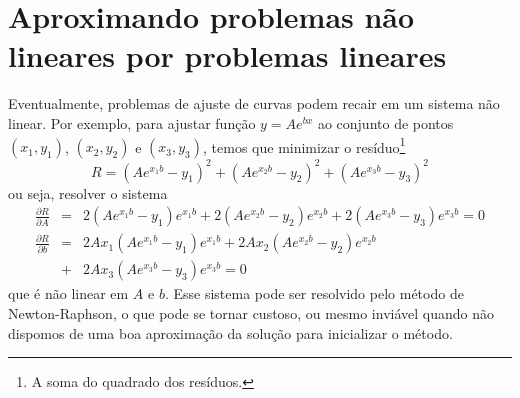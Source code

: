 


\section{Aproximando problemas não lineares por problemas lineares}

Eventualmente, problemas de ajuste de curvas podem recair em um sistema não linear. Por exemplo, para ajustar função $y=Ae^{bx}$ ao conjunto de pontos $(x_1,y_1)$, $(x_2,y_2)$ e $(x_3,y_3)$, temos que minimizar o resíduo\footnote{A soma do quadrado dos resíduos.}
\begin{equation}
R=(Ae^{x_1b}-y_1)^2+(Ae^{x_2b}-y_2)^2+(Ae^{x_3b}-y_3)^2
\end{equation}
ou seja, resolver o sistema
\begin{eqnarray}
\frac{\partial R}{\partial A} &=& 2(Ae^{x_1b}-y_1)e^{x_1b}+2(Ae^{x_2b}-y_2)e^{x_2b}+2(Ae^{x_3b}-y_3)e^{x_3b}=0\\
\frac{\partial R}{\partial b} &=& 2Ax_1(Ae^{x_1b}-y_1)e^{x_1b} + 2Ax_2(Ae^{x_2b}-y_2)e^{x_2b} \\
&+& 2Ax_3(Ae^{x_3b}-y_3)e^{x_3b}=0
\end{eqnarray}
que é não linear em $A$ e $b$. Esse sistema pode ser resolvido pelo método de Newton-Raphson, o que pode se tornar custoso, ou mesmo inviável quando não dispomos de uma boa aproximação da solução para inicializar o método.

